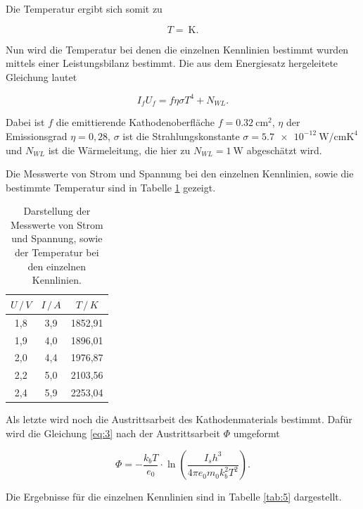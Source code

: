 Die Temperatur ergibt sich somit zu

\begin{equation*}
  T = \SI{}{\kelvin}.
\end{equation*}

Nun wird die Temperatur bei denen die einzelnen Kennlinien bestimmt wurden mittels
einer Leistungsbilanz bestimmt. Die aus dem Energiesatz hergeleitete Gleichung lautet

\begin{equation*}
  I_f U_f = f \eta \sigma T^4 + N_{WL}.
\end{equation*}

Dabei ist $f$ die emittierende Kathodenoberfläche $f = \SI{0.32}{\centi\meter\squared}$,
$\eta$ der Emissionsgrad $\eta = 0,28$, $\sigma$ ist die Strahlungskonstante $\sigma = \SI{5.7e-12}{\watt\per\centi\meter\kelvin\tothe{4}}$
und $N_{WL}$ ist die Wärmeleitung, die hier zu $N_{WL} = \SI{1}{\watt}$ abgeschätzt wird.

Die Messwerte von Strom und Spannung bei den einzelnen Kennlinien, sowie die
bestimmte Temperatur sind in Tabelle \ref{tab:4} gezeigt.

\begin{table}[H]
  \centering
  \caption{Darstellung der Messwerte von Strom und Spannung, sowie der Temperatur bei den einzelnen Kennlinien.}
  \label{tab:4}
  \begin{tabular}{c c c}
    \toprule
    $U \, / \, V$ & $I \, / \, A$ & $T \, / \, K$ \\
    \midrule
    1,8 & 3,9 & 1852,91 \\
    1,9 & 4,0 & 1896,01 \\
    2,0 & 4,4 & 1976,87 \\
    2,2 & 5,0 & 2103,56 \\
    2,4 & 5,9 & 2253,04 \\
    \bottomrule
  \end{tabular}
\end{table}


Als letzte wird noch die Austrittsarbeit des Kathodenmaterials bestimmt. Dafür wird
die Gleichung \ref{eq:3} nach der Austrittsarbeit $\Phi$ umgeformt

\begin{equation*}
  \Phi = - \frac{k_b T}{e_0} \cdot \ln \left(\frac{I_s h^3}{4 \pi e_0 m_0 k_b^2 T^2}\right).
\end{equation*}

Die Ergebnisse für die einzelnen Kennlinien sind in Tabelle \ref{tab:5} dargestellt.

